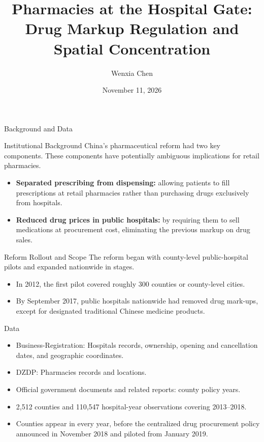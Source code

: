\documentclass[aspectratio=169,11pt]{beamer}
\title{Pharmacies at the Hospital Gate:\\Drug Markup Regulation and Spatial Concentration}
\author{Wenxia Chen}
\institute{Xiamen University}
\date{November 11, 2026}
\newcommand{\sectiondivider}[1]{%
  \begin{frame}
    \vfill
    \centering
    {\usebeamercolor[fg]{structure}\LARGE #1}
    \vfill
  \end{frame}%
}
\begin{document}
\begin{frame}[plain]
  \titlepage
\end{frame}
\sectiondivider{Background and Data}
\begin{frame}{Institutional Background}
China's pharmaceutical reform had two key components. These components
have potentially ambiguous implications for retail pharmacies.
\begin{itemize}\setlength\itemsep{1.2em}
  \item[$\uparrow$] \textbf{Separated prescribing from dispensing:} allowing
patients to fill prescriptions at retail pharmacies rather than purchasing drugs exclusively from
hospitals.
  \item[$\downarrow$] \textbf{Reduced drug prices in public hospitals:} by requiring them to sell medications
at procurement cost, eliminating the previous markup on drug sales.
\end{itemize}
\end{frame}
\begin{frame}{Reform Rollout and Scope}
\vspace{-0.95em}
\small
The reform began with county-level public-hospital pilots and expanded nationwide in stages.
\begin{itemize}
  \setlength\itemsep{1.2em}
  \setlength\topsep{1.2em}
  \item In 2012, the first pilot covered roughly 300 counties or county-level cities.
  \item By September 2017, public hospitals nationwide had removed drug mark-ups, except for designated traditional Chinese medicine products.
\end{itemize}
\end{frame}
\begin{frame}{Data}
\small
\begin{itemize}\setlength\itemsep{0.65em}
 \item Business-Registration: Hospitals records, ownership, opening and cancellation dates, and geographic coordinates. 
  \item DZDP: Pharmacies records and locations.
  \item Official government documents and related reports: county policy years.
  \item 2,512 counties and 110,547 hospital-year observations covering 2013--2018.
  \item Counties appear in every year, before the centralized drug procurement policy announced in November 2018 and piloted from January 2019.
\end{itemize}
\end{frame}
\end{document}
